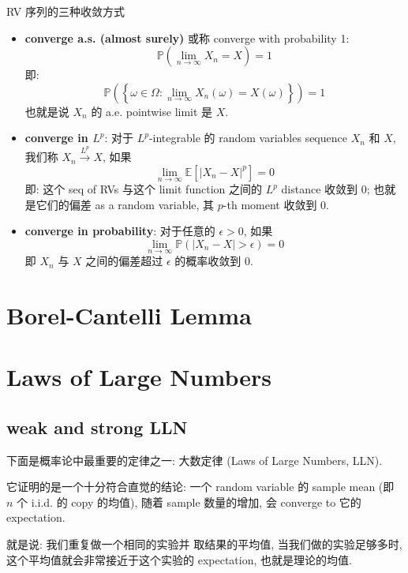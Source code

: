 \begin{definition}{RV 序列的三种收敛方式}
\begin{itemize}
\item\textbf{ converge a.s. (almost surely) }
或称 converge with probability 1:
$$
\mathbb{P}\left(\lim _{n \rightarrow \infty} X_n=X\right)=1$$
即:
$$
\mathbb{P}\left(\left\{\omega \in \Omega: \lim _{n \rightarrow \infty} X_n(\omega)=X(\omega)\right\}\right)=1
$$
也就是说 $X_n$ 的 a.e. pointwise limit 是 $X$.

\item \textbf{converge in $L^p$}:
对于 $L^p$-integrable 的 random variables sequence $X_n$ 
和 $X$, 我们称 $X_n \xrightarrow{L^p} X$, 如果
$$
\lim _{n \rightarrow \infty} \mathbb{E}\left[\left|X_n-X\right|^p\right]=0
$$
即: 这个 seq of RVs 与这个 limit function 之间的
 $L^p$ distance 收敛到 0; 
 也就是它们的偏差 as a random variable,
 其 $p$-th moment 收敛到 0. 
\item  \textbf{converge in probability}:
对于任意的 $\epsilon > 0$, 如果
$$ 
\lim_{n\to\infty} 
\mathbb{P}(|X_n  - X| > \epsilon) = 0
$$
即 $X_n$ 与 $X$ 之间的偏差超过 $\epsilon$ 的概率收敛到 0.
\end{itemize}
\end{definition}




\section{Borel-Cantelli Lemma}









\section{Laws of Large Numbers}
\subsection{weak and strong LLN}
下面是概率论中最重要的定律之一: 
大数定律 (Laws of Large Numbers, LLN).

它证明的是一个十分符合直觉的结论: 
一个 random variable 的 sample mean 
(即 $n$ 个 i.i.d. 的 copy 的均值), 随着
sample 数量的增加, 会 converge to 它的 expectation.

就是说: 我们重复做一个相同的实验并
取结果的平均值, 当我们做的实验足够多时, 
这个平均值就会非常接近于这个实验的 
expectation, 也就是理论的均值. \\


